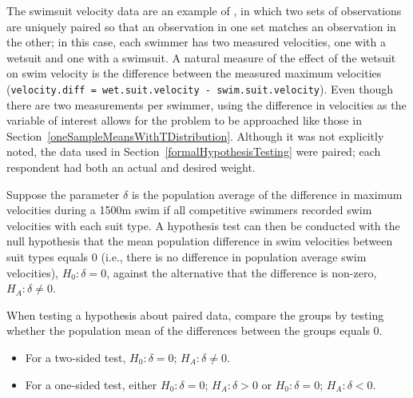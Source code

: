 %
%


	
The swimsuit velocity data are an example of , in which two sets of observations  are uniquely paired so that an observation in one set matches an observation in the other; in this case, each swimmer has two measured velocities, one with a wetsuit and one with a swimsuit. A natural measure of the effect of the wetsuit on swim velocity is the difference between the measured maximum velocities (\texttt{velocity.diff = wet.suit.velocity - swim.suit.velocity}). Even though there are two measurements per swimmer, using the difference in velocities as the variable of interest allows for the problem to be approached like those in Section~\ref{oneSampleMeansWithTDistribution}.  Although it was not explicitly noted, the data used in Section~\ref{formalHypothesisTesting} were paired; each respondent had both an actual and desired weight.

Suppose the parameter $\delta$ is the population average of the difference in maximum velocities during a 1500m swim if all competitive swimmers recorded swim velocities with each suit type. A hypothesis test can then be conducted with the null hypothesis that the mean population difference in swim velocities between suit types equals 0 (i.e., there is no difference in population average swim velocities), $H_0: \delta = 0$, against the alternative that the difference is non-zero, $H_A: \delta \neq 0$.

\begin{termBox}{
When testing a hypothesis about paired data, compare the groups by testing whether the population mean of the differences between the groups equals 0.
\begin{itemize}
\item For a two-sided test, $H_0: \delta = 0$; $H_A: \delta \neq 0$.
\item For a one-sided test, either $H_0: \delta = 0$; $H_A: \delta > 0$ or  $H_0: \delta = 0$; $H_A: \delta < 0$.
\end{itemize}
}
\end{termBox}

